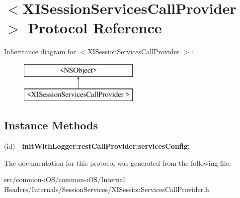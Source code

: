 \hypertarget{protocol_x_i_session_services_call_provider_01-p}{}\section{$<$X\+I\+Session\+Services\+Call\+Provider $>$ Protocol Reference}
\label{protocol_x_i_session_services_call_provider_01-p}
Inheritance diagram for $<$X\+I\+Session\+Services\+Call\+Provider $>$\+:\begin{figure}[H]
\begin{center}
\leavevmode
\includegraphics[height=2.000000cm]{protocol_x_i_session_services_call_provider_01-p}
\end{center}
\end{figure}
\subsection*{Instance Methods}
\begin{DoxyCompactItemize}
\item 
\hypertarget{protocol_x_i_session_services_call_provider_01-p_a7deb74e3d68c9539823ee6e723ddc4dd}{}\label{protocol_x_i_session_services_call_provider_01-p_a7deb74e3d68c9539823ee6e723ddc4dd} 
(id) -\/ {\bfseries init\+With\+Logger\+:rest\+Call\+Provider\+:services\+Config\+:}
\end{DoxyCompactItemize}


The documentation for this protocol was generated from the following file\+:\begin{DoxyCompactItemize}
\item 
src/common-\/i\+O\+S/common-\/i\+O\+S/\+Internal Headers/\+Internals/\+Session\+Services/X\+I\+Session\+Services\+Call\+Provider.\+h\end{DoxyCompactItemize}
